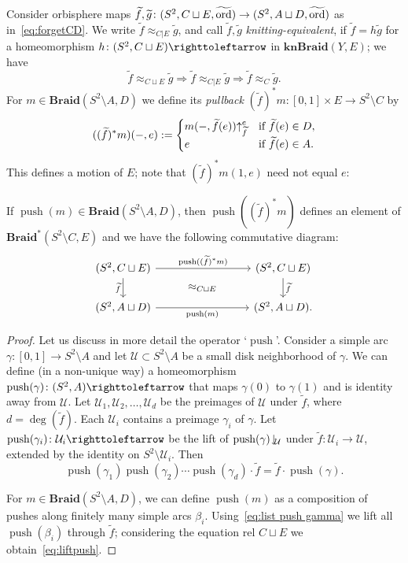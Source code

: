 \documentclass{amsart}
\newcommand\Push{{\operatorname{push}}}
\newcommand\Braid{{\mathbf{Braid}}}
\newcommand\knBraid{{\mathbf{knBraid}}}
\newcommand\wtf{{\widetilde f}}
\newcommand\wtg{{\widetilde g}}
\newcommand\wtord{{\widetilde\ord}}
\begin{document}
Consider orbisphere maps
$\wtf,\wtg\colon(S^2,C\sqcup E,\wtord)\to (S^2,A\sqcup D,\wtord)$
as in~\eqref{eq:forgetCD}. We write $\wtf\approx_{C|E}\wtg$,
and call $\wtf,\wtg$ \emph{knitting-equivalent}, if $\wtf=h\wtg$
for a homeomorphism $h\colon(S^2,C\sqcup E)\selfmap$ in
$\knBraid(Y,E)$; we have
\[\wtf\approx_{C\sqcup E}\wtg\Longrightarrow \wtf\approx_{C|E}\wtg\Longrightarrow \wtf\approx_{C}\wtg.\]
For $m\in\Braid(S^2\setminus A,D)$ we define its \emph{pullback}
$(\wtf)^*m\colon[0,1]\times E\to S^2\setminus C$ by
\[((\wtf)^*m)(-,e):= \begin{cases} m(-,\wtf(e))\lift{\wtf}{e} &\mbox{if } \wtf(e)\in D,\\
    e & \mbox{if } \wtf(e)  \in A.  \end{cases}
\]
This defines a motion of $E$; note that $(\wtf)^*m(1,e)$ need not equal
$e$:
\begin{lem}\label{lem:pushf*}
  If $\Push(m)\in \Braid(S^2\setminus A, D)$, then $\Push((\wtf)^*m)$
  defines an element of $\Braid^*(S^2\setminus C,E)$ and we have the
  following commutative diagram:
  \begin{equation}\label{eq:liftpush}
    \begin{tikzcd}[column sep=3cm]
      (S^2,C\sqcup E)\ar[r,"\Push((\wtf)^*m)"]\ar[d,"\wtf"']\ar[dr,phantom,"\approx_{C\sqcup E}"] & (S^2,C\sqcup E)\ar[d,"\wtf"]\\
    (S^2,A\sqcup D)\ar[r,"\Push(m)"'] & (S^2,A\sqcup D).
  \end{tikzcd}
\end{equation}
\end{lem}
\begin{proof}
  Let us discuss in more detail the operator `$\Push$'. Consider a
  simple arc $\gamma\colon [0,1]\to S^2\setminus A$ and let
  $\mathcal U\subset S^2\setminus A$ be a small disk neighborhood of
  $\gamma$. We can define (in a non-unique way) a homeomorphism
  $\Push(\gamma)\colon (S^2,A)\selfmap$ that maps $\gamma(0)$ to
  $\gamma(1)$ and is identity away from $\mathcal U$. Let
  $\mathcal U_1,\mathcal U_2,\dots,\mathcal U_d$ be the preimages of
  $\mathcal U$ under $\wtf$, where $d=\deg(\wtf)$. Each $\mathcal U_i$
  contains a preimage $\gamma_i$ of $\gamma$. Let
  $\Push(\gamma_i)\colon \mathcal U_i\selfmap$ be the lift of
  $\Push(\gamma)\restrict{\mathcal U}$ under
  $\wtf\colon \mathcal U_i\to\mathcal U$, extended by the identity on
  $S^2\setminus\mathcal U_i$. Then
  \begin{equation}\label{eq:list push gamma}
    \Push(\gamma_1)\Push(\gamma_2)\cdots\Push(\gamma_d)\cdot \wtf=\wtf\cdot \Push(\gamma).
  \end{equation}

  For $m\in\Braid(S^2\setminus A,D)$, we can define $\Push(m)$ as a
  composition of pushes along finitely many simple arcs
  $\beta_i$. Using~\eqref{eq:list push gamma} we lift all
  $\Push(\beta_i)$ through $\wtf$; considering the equation rel
  $C\sqcup E$ we obtain~\eqref{eq:liftpush}.
\end{proof}
\end{document}
